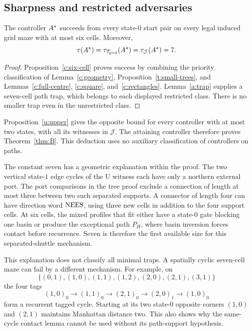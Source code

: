 \subsection{Sharpness and restricted adversaries}\label{sec:consequences}

\begin{theorem}\label{thm:attaining}
The controller $A^{\star}$ succeeds from every state-$0$ start pair on every legal induced grid maze with at most six cells. Moreover,
\[
 \tau(A^{\star})=\tau_{\mathcal T_{\rm grid}}(A^{\star})
   =\tau_{\mathcal J}(A^{\star})=7.
\]
\end{theorem}
\begin{proof}
Proposition~\ref{c:six-cell} proves success by combining the priority classification of Lemma~\ref{c:geometry}, Proposition~\ref{t:small-trees}, and Lemmas~\ref{c:full-centre}, \ref{c:square}, and~\ref{c:rectangles}. Lemma~\ref{a:trap} supplies a seven-cell path trap, which belongs to each displayed restricted class. There is no smaller trap even in the unrestricted class.
\end{proof}

Proposition~\ref{u:upper} gives the opposite bound for every controller with at most two states, with all its witnesses in $\mathcal J$. The attaining controller therefore proves Theorem~\ref{thm:B}. This deduction uses no auxiliary classification of controllers on paths.

The constant seven has a geometric explanation within the proof. The two vertical state-$1$ edge cycles of the U witness each have only a northern external port. The port comparisons in the tree proof exclude a connection of length at most three between two such separated supports. A connector of length four can have direction word $\mathrm{N}\mathrm{E}\mathrm{E}\mathrm{S}$, using three new cells in addition to the four support cells. At six cells, the mixed profiles that fit either have a state-$0$ gate blocking one basin or produce the exceptional path $P_H$, where basin inversion forces contact before recurrence. Seven is therefore the first available size for this separated-shuttle mechanism.

This explanation does not classify all minimal traps. A spatially cyclic seven-cell maze can fail by a different mechanism. For example, on
\[
 \{(0,1),(1,0),(1,1),(1,2),(2,0),(2,1),(3,1)\}
\]
the four tags
\[
 (1,0)_0\longrightarrow(1,1)_0\longrightarrow(2,1)_0
 \longrightarrow(2,0)_1\longrightarrow(1,0)_0
\]
form a recurrent tagged cycle. Starting at its two state-$0$ opposite corners $(1,0)$ and $(2,1)$ maintains Manhattan distance two. This also shows why the same-cycle contact lemma cannot be used without its path-support hypothesis.
